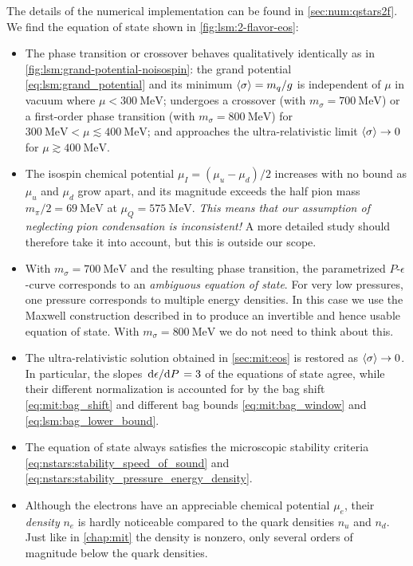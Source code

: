 The details of the numerical implementation can be found in \cref{sec:num:qstars2f}.
We find the equation of state shown in \cref{fig:lsm:2-flavor-eos}:
\begin{itemize}
\item The phase transition or crossover behaves qualitatively identically as in \cref{fig:lsm:grand-potential-noisospin}:
      the grand potential \eqref{eq:lsm:grand_potential} and its minimum $\langle \sigma \rangle=m_q/g$ is independent of $\mu$ in vacuum where $\mu < \SI{300}{\mega\electronvolt}$;
      undergoes a crossover (with $m_\sigma=\SI{700}{\mega\electronvolt}$) or a first-order phase transition (with $m_\sigma=\SI{800}{\mega\electronvolt}$) for $\SI{300}{\mega\electronvolt} < \mu \lesssim \SI{400}{\mega\electronvolt}$;
      and approaches the ultra-relativistic limit $\langle \sigma \rangle\rightarrow 0$ for $\mu \gtrsim \SI{400}{\mega\electronvolt}$.
\item The isospin chemical potential $\mu_I=(\mu_u-\mu_d)/2$ increases with no bound as $\mu_u$ and $\mu_d$ grow apart,
      and its magnitude exceeds the half pion mass $m_\pi/2 = \SI{69}{\mega\electronvolt}$ at $\mu_Q = \SI{575}{\mega\electronvolt}$.
      \emph{This means that our assumption of neglecting pion condensation is inconsistent!}
      A more detailed study should therefore take it into account, but this is outside our scope.
\item With $m_\sigma=\SI{700}{\mega\electronvolt}$ and the resulting phase transition,
      the parametrized $P$-$\epsilon$-curve corresponds to an \emph{ambiguous equation of state}.
      For very low pressures, one pressure corresponds to multiple energy densities.
      In this case we use the Maxwell construction described in  to produce an invertible and hence usable equation of state.
      With $m_\sigma=\SI{800}{\mega\electronvolt}$ we do not need to think about this.
\item The ultra-relativistic solution obtained in \cref{sec:mit:eos} is restored as $\langle \sigma \rangle \rightarrow 0$.
      In particular, the slopes $\odv{\epsilon}/{P} = 3$ of the equations of state agree,
      while their different normalization is accounted for by the bag shift \eqref{eq:mit:bag_shift} and different bag bounds \eqref{eq:mit:bag_window} and \eqref{eq:lsm:bag_lower_bound}.
\item The equation of state always satisfies the microscopic stability criteria \eqref{eq:nstars:stability_speed_of_sound} and \eqref{eq:nstars:stability_pressure_energy_density}.
\item Although the electrons have an appreciable chemical potential $\mu_e$, their \emph{density} $n_e$ is hardly noticeable compared to the quark densities $n_u$ and $n_d$.
      Just like in \cref{chap:mit} the density is nonzero, only several orders of magnitude below the quark densities.
\end{itemize}


